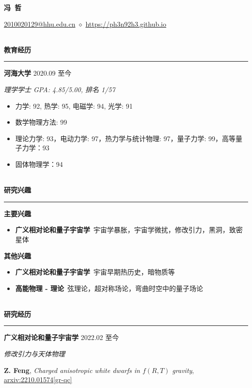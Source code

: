 \documentclass[12pt]{article}
\newcommand{\sect}[1]{
    ~\\ \noindent \textbf{#1} \medskip \hrule \medskip
}
\begin{document}
\pagestyle{empty}


\begin{center}
    \LARGE{\textbf{冯\ 哲}}
\end{center}

\begin{center}
    \href{mailto:2010020129@hhu.edu.cn}{2010020129@hhu.edu.cn} $\diamond$ \href{https://ph3n92h3.github.io}{https://ph3n92h3.github.io}
\end{center}


\sect{教育经历}

\textbf{河海大学} \hfill 2020.09 至今

\textit{理学学士 \hfill GPA: 4.85/5.00, 排名 1/57}

\begin{itemize}[noitemsep,nolistsep]
    \item 力学: 92, 热学: 95, 电磁学: 94, 光学: 91
    \item 数学物理方法: 99
    \item 理论力学: 93，电动力学: 97，热力学与统计物理: 97，量子力学: 99，高等量子力学：93
    \item 固体物理学：94
\end{itemize}


\sect{研究兴趣}

\textbf{主要兴趣}
\begin{itemize}[noitemsep,nolistsep]
    \item \textbf{广义相对论和量子宇宙学}\ 宇宙学暴胀，宇宙学微扰，修改引力，黑洞，致密星体
\end{itemize}

\textbf{其他兴趣}
\begin{itemize}[noitemsep,nolistsep]
    \item \textbf{广义相对论和量子宇宙学}\ 宇宙早期热历史，暗物质等
    \item \textbf{高能物理 - 理论}\ 弦理论，超对称场论，弯曲时空中的量子场论
\end{itemize}


\sect{研究经历}

\textbf{广义相对论和量子宇宙学} \hfill 2022.02 至今

\smallskip \quad \textit{修改引力与天体物理}

\textbf{Z. Feng}, \textit{Charged anisotropic white dwarfs in $f\left({R}, {T}\right)$ gravity}, \href{https://arxiv.org/abs/2210.01574}{arxiv:2210.01574[gr-qc]}
\end{document}
